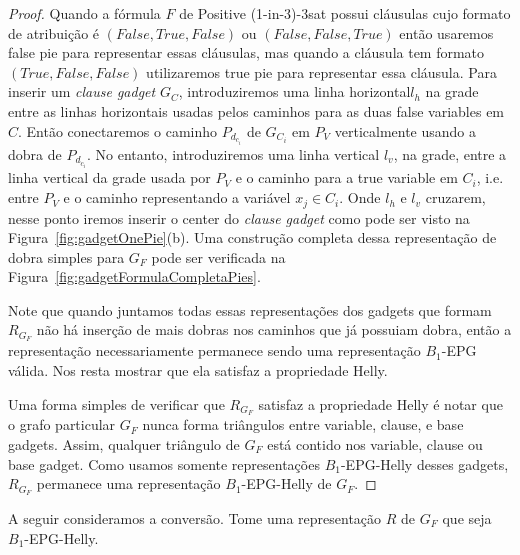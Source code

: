 \begin{proof}
Quando a fórmula  $F$ de {\sc Positive (1-in-3)-3sat} possui cláusulas cujo formato de atribuição é $(False, True, False)$ ou $(False, False, True)$ então usaremos false pie para representar essas cláusulas, mas quando a cláusula tem formato  $(True, False, False)$ utilizaremos  true pie para representar essa cláusula. Para inserir um  \textit{ clause gadget} $G_{C}$, introduziremos uma linha horizontal$l_{h}$ na grade entre as linhas horizontais usadas pelos caminhos para as duas false variables em $ C $. Então conectaremos o caminho $P_{d_{c_i}}$ de $G_{C_i}$ em $P_{V}$ verticalmente usando a dobra de  $P_{d_{c_i}}$. No entanto, introduziremos uma linha vertical $ l_{v}$, na grade, entre a linha vertical da grade usada por $P_{V}$ e o caminho para  a true variable em $C_i$, i.e. entre $P_{V}$ e o caminho representando a variável  $x_j \in C_i$. Onde  $l_{h}$  e $l_{v}$ cruzarem, nesse ponto iremos inserir o center do  \textit{clause gadget} como pode ser visto na Figura~\ref{fig:gadgetOnePie}(b). Uma construção completa dessa representação de dobra simples para  $G_F$ pode ser verificada na 
Figura~\ref{fig:gadgetFormulaCompletaPies}.%

\begin{landscape}

\end{landscape}





Note que quando juntamos todas essas representações  dos  gadgets que formam $ R_{G_F} $ não há inserção de mais dobras nos caminhos que já possuiam dobra, então a representação necessariamente permanece sendo uma representação  $ B_1$-EPG válida. Nos resta mostrar que ela satisfaz a propriedade Helly. 

Uma forma simples de verificar que $ R_{G_F} $ satisfaz a propriedade Helly é notar que o grafo particular  $G_F$ nunca forma triângulos entre variable, clause, e base gadgets. Assim, qualquer triângulo de  $G_F$ está contido nos variable, clause ou base gadget. Como usamos somente representações  $B_1$-EPG-Helly desses gadgets, $ R_{G_F} $ permanece uma representação $B_1$-EPG-Helly de $G_F$.
 \end{proof}


A seguir consideramos a conversão. Tome uma representação $R$ de $G_F$ que seja $B_1$-EPG-Helly.


